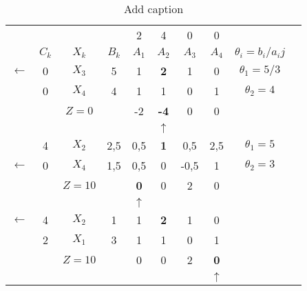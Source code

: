 \begin{table}[ht]
  \centering
  \caption{Add caption}
    \begin{tabular}{cccccccccc}
\cmidrule{2-9}          &       &       &       & 2     & 4     & 0     & 0     &       &  \\
          & $C_k$ & $X_k$ & $B_k$ & $A_1$ & $A_2$ & $A_3$ & $A_4$ & $\theta_i = b_i/a_ij$ &  \\
\cmidrule{2-9}    $\leftarrow$ & 0     & \textcolor[rgb]{ 1,  0,  0}{\boldmath{}\textbf{$X_3$}\unboldmath{}} & 5     & 1     & \textbf{2} & 1     & 0     & \boldmath{}\textbf{$\theta_1 = 5/3$}\unboldmath{} &  \\
          & 0     & $X_4$ & 4     & 1     & 1     & 0     & 1     & $\theta_2 = 4$ &  \\
\cmidrule{2-9}          &       & $Z=0$ &       & -2    & \textcolor[rgb]{ 0,  0,  1}{\textbf{-4}} & 0     & 0     &       &  \\
\cmidrule{2-9}          &       &       &       &       & $\uparrow$ &       &       &       &  \\
\cmidrule{2-9}          & 4     & $X_2$ & 2,5   & 0,5   & \textbf{1} & 0,5   & 2,5   & \boldmath{}\textbf{$\theta_1 = 5$}\unboldmath{} &  \\
    $\leftarrow$ & 0     & \textcolor[rgb]{ 1,  0,  0}{\boldmath{}\textbf{$X_4$}\unboldmath{}} & 1,5   & 0,5   & 0     & -0,5  & 1     & $\theta_2 = 3$ &  \\
\cmidrule{2-9}          &       & $Z=10$ &       & \textcolor[rgb]{ 0,  0,  1}{\textbf{0}} & 0     & 2     & 0     &       &  \\
\cmidrule{2-9}          &       &       &       & $\uparrow$ &       &       &       &       &  \\
\cmidrule{2-9}    $\leftarrow$ & 4     & \textcolor[rgb]{ 1,  0,  0}{\boldmath{}\textbf{$X_2$}\unboldmath{}} & 1     & 1     & \textbf{2} & 1     & 0     &       &  \\
          & 2     & $X_1$ & 3     & 1     & 1     & 0     & 1     &       &  \\
\cmidrule{2-9}          &       & $Z=10$ &       & 0     & 0     & 2     & \textcolor[rgb]{ 0,  0,  1}{\textbf{0}} &       &  \\
\cmidrule{2-9}          &       &       &       &       &       &       & $\uparrow$ &       &  \\
    \end{tabular}%
  \label{tab:addlabel}%
\end{table}%
